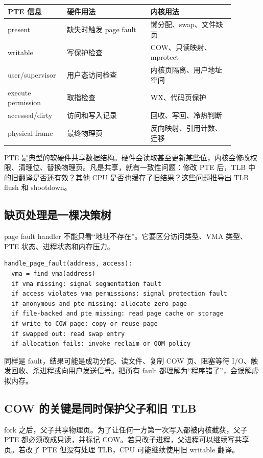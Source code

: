 \begin{longtable}{p{0.2\linewidth}p{0.34\linewidth}p{0.34\linewidth}}
\toprule
PTE 信息 & 硬件用法 & 内核用法 \\
\midrule
present & 缺失时触发 page fault & 懒分配、swap、文件缺页 \\
writable & 写保护检查 & COW、只读映射、mprotect \\
user/supervisor & 用户态访问检查 & 内核页隔离、用户地址空间 \\
execute permission & 取指检查 & W\^X、代码页保护 \\
accessed/dirty & 访问和写入记录 & 回收、写回、冷热判断 \\
physical frame & 最终物理页 & 反向映射、引用计数、迁移 \\
\bottomrule
\end{longtable}

PTE 是典型的软硬件共享数据结构。硬件会读取甚至更新某些位，内核会修改权限、清理位、替换物理页。凡是共享，就有一致性问题：修改 PTE 后，TLB 中的旧翻译是否还有效？其他 CPU 是否也缓存了旧结果？这些问题推导出 TLB flush 和 shootdown。

\subsection{缺页处理是一棵决策树}

page fault handler 不能只看“地址不存在”。它要区分访问类型、VMA 类型、PTE 状态、进程状态和内存压力。

\begin{lstlisting}
handle_page_fault(address, access):
  vma = find_vma(address)
  if vma missing: signal segmentation fault
  if access violates vma permissions: signal protection fault
  if anonymous and pte missing: allocate zero page
  if file-backed and pte missing: read page cache or storage
  if write to COW page: copy or reuse page
  if swapped out: read swap entry
  if allocation fails: invoke reclaim or OOM policy
\end{lstlisting}

同样是 fault，结果可能是成功分配、读文件、复制 COW 页、阻塞等待 I/O、触发回收、杀进程或向用户发送信号。把所有 fault 都理解为“程序错了”，会误解虚拟内存。

\subsection{COW 的关键是同时保护父子和旧 TLB}

fork 之后，父子共享物理页。为了让任何一方第一次写入都被内核截获，父子 PTE 都必须改成只读，并标记 COW。若只改子进程，父进程可以继续写共享页。若改了 PTE 但没有处理 TLB，CPU 可能继续使用旧 writable 翻译。

